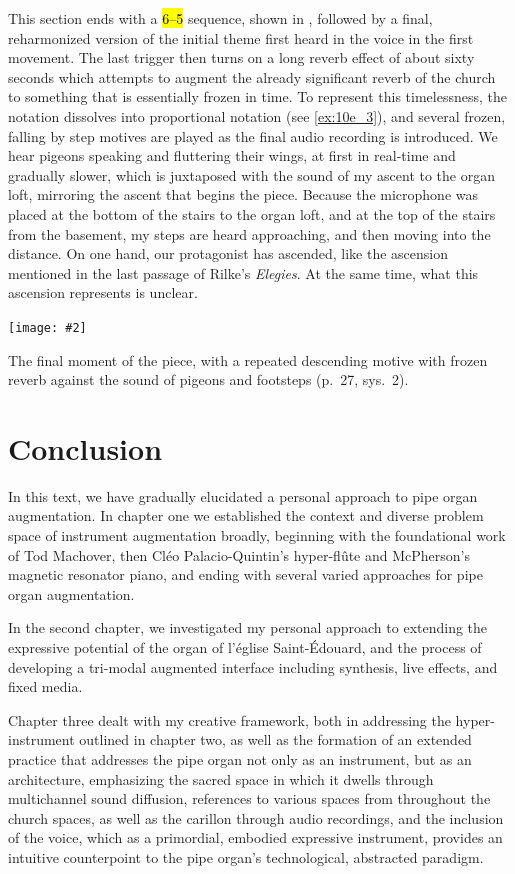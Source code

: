 \documentclass[12pt,twoside,maitrise]{dms_ks}
\newcommand{\customincludeexamples}[4][]{%
    \begin{example}[H]
        \centering
        \texttt{[image: \#2]}
        \caption{#4}
	\label{#3} 
    \end{example}
}
\theoremstyle{definition}
\begin{document}
{This section ends with a \hl{6--5} sequence, shown in , followed by a final, reharmonized version of the initial theme first heard in the voice in the first movement. 
The last trigger then turns on a long reverb effect of about sixty seconds which attempts to augment the already significant reverb of the church to something that is essentially frozen in time. 
To represent this timelessness, the notation dissolves into proportional notation (see \cref{ex:10e_3}), and several frozen, falling by step motives are played as the final audio recording is introduced. 
We hear pigeons speaking and fluttering their wings, at first in real-time and gradually slower, which is juxtaposed with the sound of my ascent to the organ loft, mirroring the ascent that begins the piece. 
Because the microphone was placed at the bottom of the stairs to the organ loft, and at the top of the stairs from the basement, my steps are heard approaching, and then moving into the distance. 
On one hand, our protagonist has ascended, like the ascension mentioned in the last passage of Rilke's \textit{Elegies}. 
At the same time, what this ascension represents is unclear.

\customincludeexamples[width=\textwidth]{10e_3}{ex:10e_3}{The final moment of the piece, with a repeated descending motive with frozen reverb against the sound of pigeons and footsteps (p.~27, sys.~2).}

\chapter*{Conclusion}

In this text, we have gradually elucidated a personal approach to pipe organ augmentation.
In chapter one we established the context and diverse problem space of instrument augmentation broadly, beginning with the foundational work of Tod Machover, then Cléo Palacio-Quintin's hyper-flûte and McPherson's magnetic resonator piano, and ending with several varied approaches for pipe organ augmentation.

In the second chapter, we investigated my personal approach to extending the expressive potential of the organ of l'église Saint-Édouard, and the process of developing a tri-modal augmented interface including synthesis, live effects, and fixed media.

Chapter three dealt with my creative framework, both in addressing the hyper-instrument outlined in chapter two, as well as the formation of an extended practice that addresses the pipe organ not only as an instrument, but as an architecture, emphasizing the sacred space in which it dwells through multichannel sound diffusion, references to various spaces from throughout the church spaces, as well as the carillon through audio recordings, and the inclusion of the voice, which as a primordial, embodied expressive instrument, provides an intuitive counterpoint to the pipe organ's technological, abstracted paradigm. 

}
\end{document}
